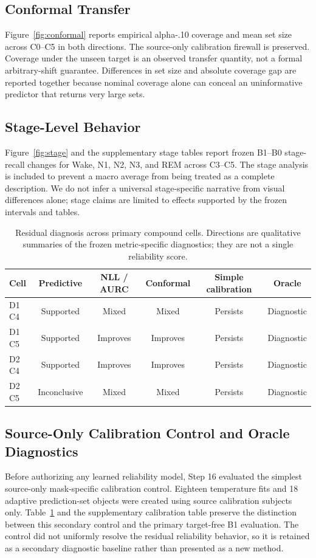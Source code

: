 \documentclass[10pt,twocolumn]{article}
\begin{document}
\subsection{Conformal Transfer}
Figure~\ref{fig:conformal} reports empirical alpha-.10 coverage and mean set size across C0--C5 in both directions. The source-only calibration firewall is preserved. Coverage under the unseen target is an observed transfer quantity, not a formal arbitrary-shift guarantee. Differences in set size and absolute coverage gap are reported together because nominal coverage alone can conceal an uninformative predictor that returns very large sets.

\subsection{Stage-Level Behavior}
Figure~\ref{fig:stage} and the supplementary stage tables report frozen B1--B0 stage-recall changes for Wake, N1, N2, N3, and REM across C3--C5. The stage analysis is included to prevent a macro average from being treated as a complete description. We do not infer a universal stage-specific narrative from visual differences alone; stage claims are limited to effects supported by the frozen intervals and tables.

\begin{table}[t]
\centering\scriptsize
\caption{Residual diagnosis across primary compound cells. Directions are qualitative summaries of the frozen metric-specific diagnostics; they are not a single reliability score.}
\label{tab:residual}
\begin{tabular}{lccccc}
\toprule
Cell & Predictive & NLL / AURC & Conformal & Simple calibration & Oracle\\
\midrule
D1 C4 & Supported & Mixed & Mixed & Persists & Diagnostic\\
D1 C5 & Supported & Improves & Improves & Persists & Diagnostic\\
D2 C4 & Supported & Improves & Improves & Persists & Diagnostic\\
D2 C5 & Inconclusive & Mixed & Mixed & Persists & Diagnostic\\
\bottomrule
\end{tabular}
\end{table}

\subsection{Source-Only Calibration Control and Oracle Diagnostics}
Before authorizing any learned reliability model, Step 16 evaluated the simplest source-only mask-specific calibration control. Eighteen temperature fits and 18 adaptive prediction-set objects were created using source calibration subjects only. Table~\ref{tab:residual} and the supplementary calibration table preserve the distinction between this secondary control and the primary target-free B1 evaluation. The control did not uniformly resolve the residual reliability behavior, so it is retained as a secondary diagnostic baseline rather than presented as a new method.
\end{document}
